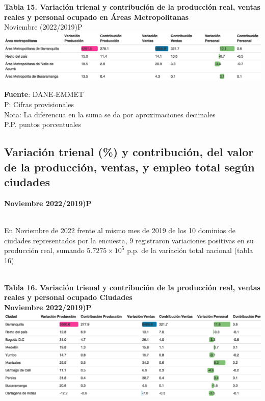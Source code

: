 \documentclass[
]{article}
\begin{document}
\textbf{Tabla 15. Variación trienal y contribución de la producción
real, ventas reales y personal ocupado en Áreas Metropolitanas}\\
Noviembre (2022/2019)P\\

\includegraphics{boletin_files/figure-latex/tabla15_view-1.png}

\textbf{Fuente}: DANE-EMMET\\
P: Cifras provisionales\\
Nota: La diferencua en la suma se da por aproximaciones decimales\\
P.P. puntos porcentuales\\

\hypertarget{variaciuxf3n-trienal-y-contribuciuxf3n-del-valor-de-la-producciuxf3n-ventas-y-empleo-total-seguxfan-ciudades}{%
\subsection{Variación trienal (\%) y contribución, del valor de la
producción, ventas, y empleo total según
ciudades}\label{variaciuxf3n-trienal-y-contribuciuxf3n-del-valor-de-la-producciuxf3n-ventas-y-empleo-total-seguxfan-ciudades}}

\textbf{Noviembre 2022/2019)P}\\
\strut \\

En Noviembre de 2022 frente al mismo mes de 2019 de los 10 dominios de
ciudades representados por la encuesta, 9 registraron variaciones
positivas en su producción real, sumando
\ensuremath{5.7275\times 10^{5}} p.p. de la variación total nacional
(tabla 16)\\
\strut \\
\textbf{Tabla 16. Variación trienal y contribución de la producción
real, ventas reales y personal ocupado Ciudades}\\
\textbf{Noviembre 2022/2019)P}\\

\includegraphics{boletin_files/figure-latex/tabla16_view-1.png}
\end{document}

